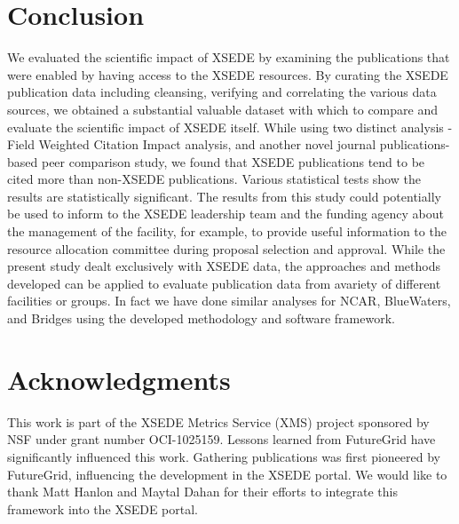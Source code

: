 \documentclass{sig-alternate}
\begin{document}
\section{Conclusion} \label{S:conclusion}

We evaluated the scientific impact of XSEDE by examining the
publications that were enabled by having access to the XSEDE
resources. By curating the XSEDE publication data including cleansing,
verifying and correlating the various data sources, we obtained a
substantial valuable dataset with which to compare and evaluate the
scientific impact of XSEDE itself.  While using two distinct analysis
- Field Weighted Citation Impact analysis, and another novel journal
publications-based peer comparison study, we found that XSEDE
publications tend to be cited more than non-XSEDE publications.
Various statistical tests show the results are statistically
significant.  The results from this study could potentially be used to
inform to the XSEDE leadership team and the funding agency about the
management of the facility, for example, to provide useful information
to the resource allocation committee during proposal selection and
approval.  While the present study dealt exclusively with XSEDE data,
the approaches and methods developed can be applied to evaluate
publication data from avariety of different facilities or groups.  In
fact we have done similar analyses for NCAR, BlueWaters, and Bridges
using the developed methodology and software framework.


\section{Acknowledgments}

This work is part of the XSEDE Metrics Service (XMS) project sponsored
by NSF under grant number OCI-1025159. Lessons learned from FutureGrid
have significantly influenced this work. Gathering publications was
first pioneered by FutureGrid, influencing the development in the XSEDE
portal. We would like to thank Matt Hanlon and Maytal Dahan for their
efforts to integrate this framework into the XSEDE portal.


 
 
\end{document}
